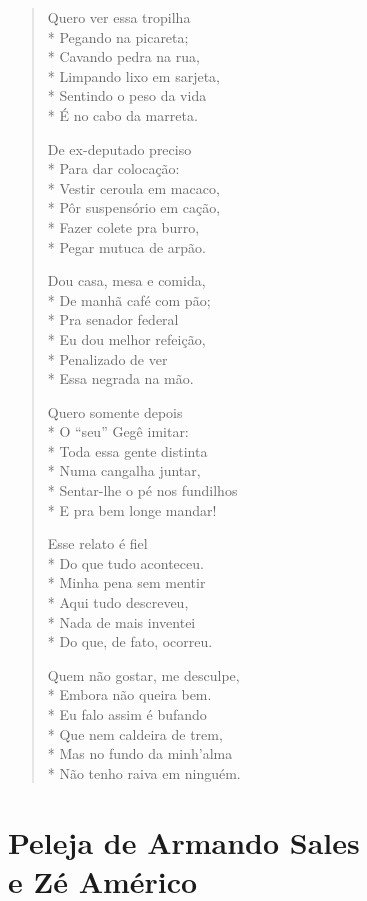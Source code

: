 \begin{verse}
Quero ver essa tropilha\\*
Pegando na picareta;\\*
Cavando pedra na rua,\\*
Limpando lixo em sarjeta,\\*
Sentindo o peso da vida\\*
É no cabo da marreta.

De ex-deputado preciso\\*
Para dar colocação:\\*
Vestir ceroula em macaco,\\*
Pôr suspensório em cação,\\*
Fazer colete pra burro,\\*
Pegar mutuca de arpão.

Dou casa, mesa e comida,\\*
De manhã café com pão;\\*
Pra senador federal\\*
Eu dou melhor refeição, \\*
Penalizado de ver\\*
Essa negrada na mão.

Quero somente depois\\*
O “seu” Gegê imitar:\\*
Toda essa gente distinta\\*
Numa cangalha juntar,\\*
Sentar-lhe o pé nos fundilhos\\*
E pra bem longe mandar!

Esse relato é fiel\\*
Do que tudo aconteceu.\\*
Minha pena sem mentir\\*
Aqui tudo descreveu,\\*
Nada de mais inventei\\*
Do que, de fato, ocorreu.

Quem não gostar, me desculpe,\\*
Embora não queira bem.\\*
Eu falo assim é bufando\\*
Que nem caldeira de trem,\\*
Mas no fundo da minh’alma\\*
Não tenho raiva em ninguém.
\end{verse}

\chapter[Peleja de Armando Sales e Zé Américo]{Peleja de Armando Sales\\ e Zé Américo}

